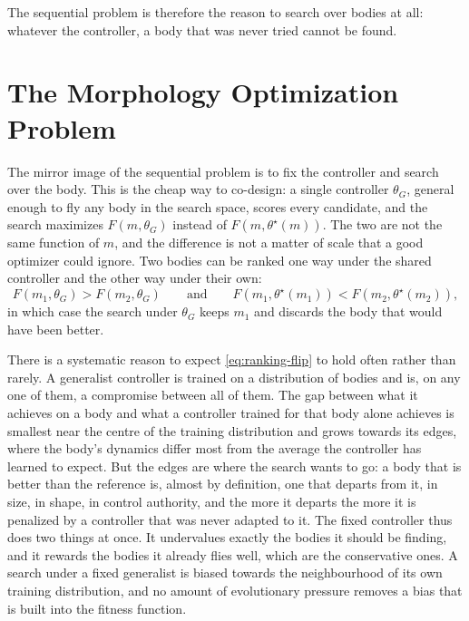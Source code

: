 The sequential problem is therefore the reason to search over bodies at all: whatever the controller, a body that was never tried cannot be found.

\section{The Morphology Optimization Problem}
\label{sec:problem-morphology}

The mirror image of the sequential problem is to fix the controller and search over the body. This is the cheap way to co-design: a single controller $\theta_G$, general enough to fly any body in the search space, scores every candidate, and the search maximizes $F(m, \theta_G)$ instead of $F(m, \theta^{\star}(m))$. The two are not the same function of $m$, and the difference is not a matter of scale that a good optimizer could ignore. Two bodies can be ranked one way under the shared controller and the other way under their own:
\begin{equation}
F(m_1, \theta_G) > F(m_2, \theta_G) \qquad \text{and} \qquad F(m_1, \theta^{\star}(m_1)) < F(m_2, \theta^{\star}(m_2)),
\label{eq:ranking-flip}
\end{equation}
in which case the search under $\theta_G$ keeps $m_1$ and discards the body that would have been better.

There is a systematic reason to expect \eqref{eq:ranking-flip} to hold often rather than rarely. A generalist controller is trained on a distribution of bodies and is, on any one of them, a compromise between all of them. The gap between what it achieves on a body and what a controller trained for that body alone achieves is smallest near the centre of the training distribution and grows towards its edges, where the body's dynamics differ most from the average the controller has learned to expect. But the edges are where the search wants to go: a body that is better than the reference is, almost by definition, one that departs from it, in size, in shape, in control authority, and the more it departs the more it is penalized by a controller that was never adapted to it. The fixed controller thus does two things at once. It undervalues exactly the bodies it should be finding, and it rewards the bodies it already flies well, which are the conservative ones. A search under a fixed generalist is biased towards the neighbourhood of its own training distribution, and no amount of evolutionary pressure removes a bias that is built into the fitness function.

